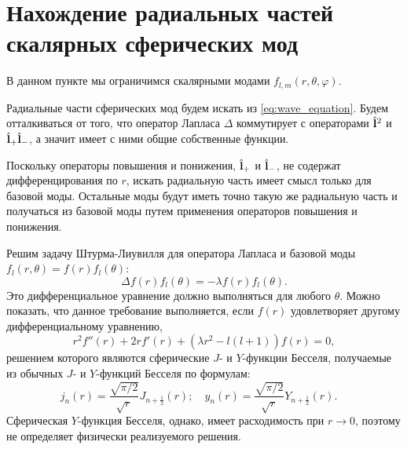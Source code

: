 \documentclass[12pt,a4paper]{article}
\begin{document}

    \section{Нахождение радиальных частей скалярных сферических мод}

        В данном пункте мы ограничимся скалярными модами $f_{l,m}(r,\theta,\varphi)$.

        Радиальные части сферических мод будем искать из \autoref{eq:wave_equation}. Будем отталкиваться от того, что оператор Лапласа $\Delta$ коммутирует с операторами $\hat{\mathbf{l}}^2$ и $\hat{\mathbf{l}}_{+} \hat{\mathbf{l}}_{-}$, а значит имеет с ними общие собственные функции.

        Поскольку операторы повышения и понижения, $\hat{\mathbf{l}}_{+}$ и $\hat{\mathbf{l}}_{-}$, не содержат дифференцирования по $r$, искать радиальную часть имеет смысл только для базовой моды. Остальные моды будут иметь точно такую же радиальную часть и получаться из базовой моды путем применения операторов повышения и понижения.

        Решим задачу Штурма-Лиувилля для оператора Лапласа и базовой моды $f_{l}(r,\theta) = f(r) f_{l}(\theta)$:
        \begin{equation}
            \Delta f(r) f_{l}(\theta) = - \lambda f(r) f_{l}(\theta) .
        \end{equation}
        Это дифференциальное уравнение должно выполняться для любого $\theta$. Можно показать, что данное требование выполняется, если $f(r)$ удовлетворяет другому дифференциальному уравнению,
        \begin{equation}
            r^2 f''(r) + 2 r f'(r) + (\lambda r^2 - l(l+1)) f(r) = 0 ,
        \end{equation}
        решением которого являются сферические $J$- и $Y$-функции Бесселя, получаемые из обычных $J$- и $Y$-функций Бесселя по формулам:
        \begin{equation}
            j_n(r) = \frac{\sqrt{\pi/2}}{\sqrt{r}} J_{n+\frac{1}{2}}(r) ; \quad
            y_n(r) = \frac{\sqrt{\pi/2}}{\sqrt{r}} Y_{n+\frac{1}{2}}(r) . \quad
        \end{equation}
        Сферическая $Y$-функция Бесселя, однако, имеет расходимость при $r \to 0$, поэтому не определяет физически реализуемого решения.
\end{document}
